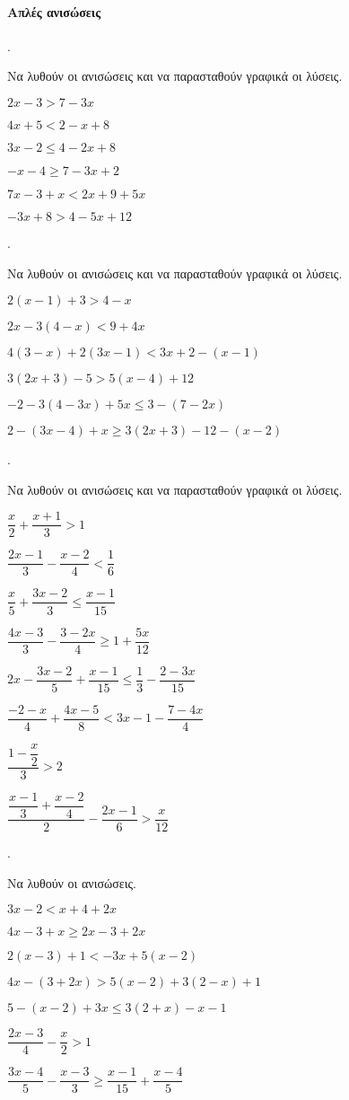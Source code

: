 \documentclass[11pt,a4paper,twocolumn]{article}
\newcounter{askhsh}
\newcommand{\askhsh}{\large\theaskhsh.\ \addtocounter{askhsh}{1}}
\begin{document}
\paragraph{Απλές ανισώσεις}
\askhsh Να λυθούν οι ανισώσεις και να παρασταθούν γραφικά οι λύσεις.
\begin{alist}
\item $ 2x-3>7-3x $
\item $ 4x+5<2-x+8 $
\item $ 3x-2\leq4-2x+8 $
\item $ -x-4\geq7-3x+2 $
\item $ 7x-3+x<2x+9+5x $
\item $ -3x+8>4-5x+12 $
\end{alist}
\askhsh Να λυθούν οι ανισώσεις και να παρασταθούν γραφικά οι λύσεις.
\begin{alist}
\item $ 2(x-1)+3>4-x $
\item $ 2x-3(4-x)<9+4x $
\item $ 4(3-x)+2(3x-1)<3x+2-(x-1) $
\item $ 3(2x+3)-5>5(x-4)+12 $
\item $ -2-3(4-3x)+5x\leq3-(7-2x) $
\item $ 2-(3x-4)+x\geq3(2x+3)-12-(x-2) $
\end{alist}
\askhsh Να λυθούν οι ανισώσεις και να παρασταθούν γραφικά οι λύσεις.
\begin{alist}
\item $ \dfrac{x}{2}+\dfrac{x+1}{3}>1 $
\item $ \dfrac{2x-1}{3}-\dfrac{x-2}{4}<\dfrac{1}{6} $
\item $ \dfrac{x}{5}+\dfrac{3x-2}{3}\leq\dfrac{x-1}{15} $
\item $ \dfrac{4x-3}{3}-\dfrac{3-2x}{4}\geq1+\dfrac{5x}{12} $
\item $ 2x-\dfrac{3x-2}{5}+\dfrac{x-1}{15}\leq\dfrac{1}{3}-\dfrac{2-3x}{15} $
\item $ \dfrac{-2-x}{4}+\dfrac{4x-5}{8}<3x-1-\dfrac{7-4x}{4} $
\item $ \dfrac{1-\dfrac{x}{2}}{3}>2 $
\item $ \dfrac{\dfrac{x-1}{3}+\dfrac{x-2}{4}}{2}-\dfrac{2x-1}{6}>\dfrac{x}{12} $
\end{alist}
\askhsh Να λυθούν οι ανισώσεις.
\begin{alist}
\item $ 3x-2<x+4+2x $
\item $ 4x-3+x\geq2x-3+2x $
\item $ 2(x-3)+1<-3x+5(x-2) $
\item $ 4x-(3+2x)>5(x-2)+3(2-x)+1 $
\item $ 5-(x-2)+3x\leq3(2+x)-x-1 $
\item $ \dfrac{2x-3}{4}-\dfrac{x}{2}>1 $
\item $ \dfrac{3x-4}{5}-\dfrac{x-3}{3}\geq\dfrac{x-1}{15}+\dfrac{x-4}{5} $
\end{alist}
\end{document}
